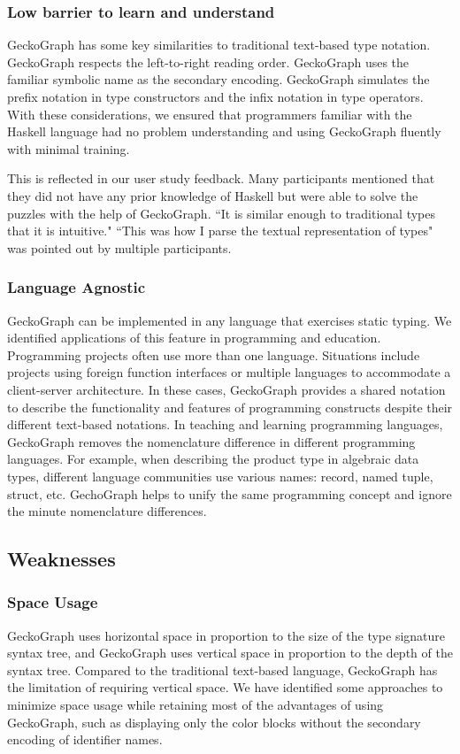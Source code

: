 \documentclass[preprint,12pt]{elsarticle}
\begin{document}
\subsubsection{Low barrier to learn and understand}
GeckoGraph has some key similarities to traditional text-based type notation. GeckoGraph respects the left-to-right reading order. GeckoGraph uses the familiar symbolic name as the secondary encoding. GeckoGraph simulates the prefix notation in type constructors and the infix notation in type operators. With these considerations, we ensured that programmers familiar with the Haskell language had no problem understanding and using GeckoGraph fluently with minimal training. 

This is reflected in our user study feedback. Many participants mentioned that they did not have any prior knowledge of Haskell but were able to solve the puzzles with the help of GeckoGraph.
``It is similar enough to traditional types that it is intuitive." ``This was how I parse the textual representation of types" was pointed out by multiple participants.

\subsubsection{Language Agnostic}
GeckoGraph can be implemented in any language that exercises static typing. We identified applications of this feature in programming and education. Programming projects often use more than one language. Situations include projects using foreign function interfaces or multiple languages to accommodate a client-server architecture. In these cases, GeckoGraph provides a shared notation to describe the functionality and features of programming constructs despite their different text-based notations. In teaching and learning programming languages, GeckoGraph removes the nomenclature difference in different programming languages. For example, when describing the product type in algebraic data types, different language communities use various names: record, named tuple, struct, etc. GechoGraph helps to unify the same programming concept and ignore the minute nomenclature differences.

\subsection{Weaknesses}
\subsubsection{Space Usage}\label{subsec:space}
GeckoGraph uses horizontal space in proportion to the size of the type signature syntax tree, and GeckoGraph uses vertical space in proportion to the depth of the syntax tree. Compared to the traditional text-based language, GeckoGraph has the limitation of requiring vertical space. We have identified some approaches to minimize space usage while retaining most of the advantages of using GeckoGraph, such as displaying only the color blocks without the secondary encoding of identifier names.
\end{document}
